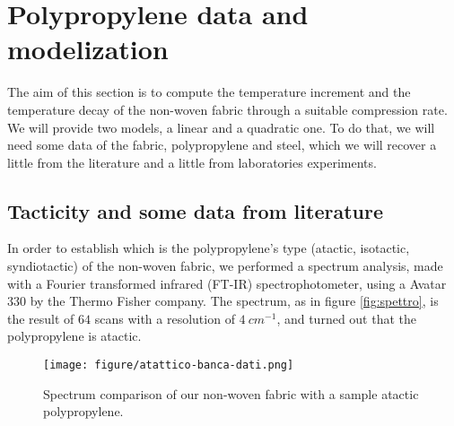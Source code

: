 
\section{Polypropylene data and modelization}
\label{polypropylene}
The aim of this section is to compute the temperature increment and the temperature decay of the non-woven fabric through a suitable compression rate. We will provide two models, a linear and a quadratic one. To do that, we will need some data of the fabric, polypropylene and steel, which we will recover a little from the literature and a little from laboratories experiments.
\subsection{Tacticity and some data from literature}
In order to establish which is the polypropylene's type (atactic, isotactic, syndiotactic) of the non-woven fabric, we performed a spectrum analysis, made with a Fourier transformed infrared (FT-IR) spectrophotometer, using a Avatar 330 by the Thermo Fisher company. The spectrum, as in figure \eqref{fig:spettro}, is the result of $64$ scans with a resolution of $4\ \unit{cm}^{-1}$, and turned out that the polypropylene is atactic.


\begin{figure}[H]
  \begin{center}
    \texttt{[image: figure/atattico-banca-dati.png]}
  \end{center}
  \caption{Spectrum comparison of our non-woven fabric with a sample atactic polypropylene.}
  \label{fig:spettro}
\end{figure}

